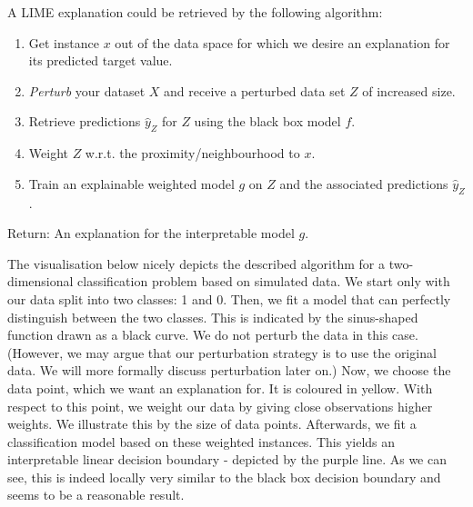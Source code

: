 \documentclass[
]{krantz}
\begin{document}
A LIME explanation could be retrieved by the following algorithm:

\begin{enumerate}
\def\labelenumi{\arabic{enumi}.}
\item
  Get instance \(x\) out of the data space for which we desire an explanation for its predicted target value.
\item
  \emph{Perturb} your dataset \(X\) and receive a perturbed data set \(Z\) of increased size.
\item
  Retrieve predictions \(\hat{y}_{Z}\) for \(Z\) using the black box model \(f\).
\item
  Weight \(Z\) w.r.t. the proximity/neighbourhood to \(x\).
\item
  Train an explainable weighted model \(g\) on \(Z\) and the associated predictions \(\hat{y}_{Z}\).
\end{enumerate}

Return: An explanation for the interpretable model \(g\).

The visualisation below nicely depicts the described algorithm for a two-dimensional classification problem based on simulated data.
We start only with our data split into two classes: 1 and 0.
Then, we fit a model that can perfectly distinguish between the two classes.
This is indicated by the sinus-shaped function drawn as a black curve.
We do not perturb the data in this case.
(However, we may argue that our perturbation strategy is to use the original data.
We will more formally discuss perturbation later on.)
Now, we choose the data point, which we want an explanation for.
It is coloured in yellow.
With respect to this point, we weight our data by giving close observations higher weights.
We illustrate this by the size of data points.
Afterwards, we fit a classification model based on these weighted instances.
This yields an interpretable linear decision boundary - depicted by the purple line.
As we can see, this is indeed locally very similar to the black box decision boundary and seems to be a reasonable result.
\end{document}

